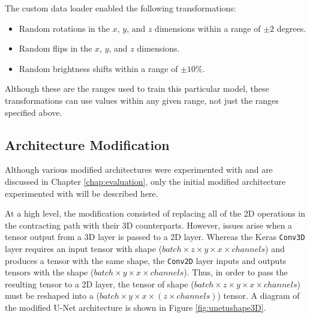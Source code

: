The custom data loader enabled the following transformations:
\begin{itemize}
    \item Random rotations in the $x$, $y$, and $z$ dimensions within a range of $\pm 2$ degrees.
    \item Random flips in the $x$, $y$, and $z$ dimensions.
    \item Random brightness shifts within a range of $\pm 10$\%.
\end{itemize}
Although these are the ranges used to train this particular model, these transformations can use values within any given range, not just the ranges specified above.


\subsection{Architecture Modification}

Although various modified architectures were experimented with and are discussed in Chapter \ref{chap:evaluation}, only the initial modified architecture experimented with will be described here.

At a high level, the modification consisted of replacing all of the 2D operations in the contracting path with their 3D counterparts. However, issues arise when a tensor output from a 3D layer is passed to a 2D layer. Whereas the Keras \texttt{Conv3D} layer requires an input tensor with shape ($batch \times z \times y \times x \times channels$) and produces a tensor with the same shape, the \texttt{Conv2D} layer inputs and outputs tensors with the shape ($batch \times y \times x \times channels$). Thus, in order to pass the resulting tensor to a 2D layer, the tensor of shape ($batch \times z \times y \times x \times channels$) must be reshaped into a ($batch \times y \times x \times (z \times channels)$) tensor. A diagram of the modified U-Net architecture is shown in Figure \ref{fig:unetushape3D}.

